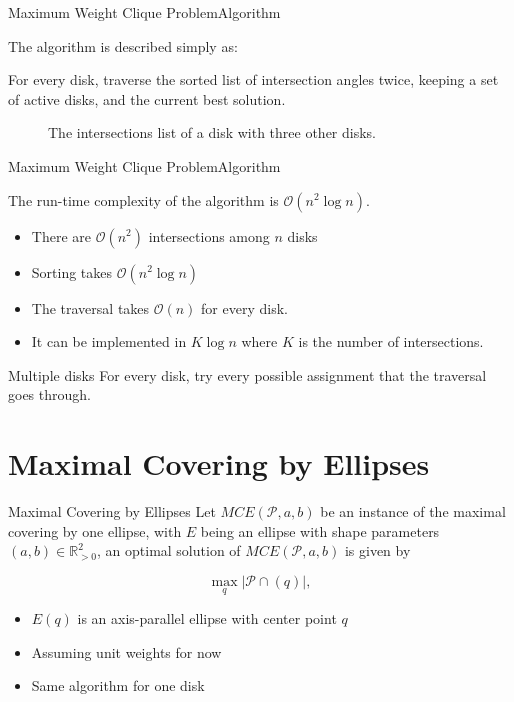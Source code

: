 \documentclass{beamer}
\newcommand{\R}{\mathbb{R}}
\newcommand{\Pp}{\mathscr{P}}
\newcommand{\bigO}{\mathscr{O}}
\begin{document}
\begin{frame}{Maximum Weight Clique Problem}{Algorithm}
	
	The algorithm is described simply as:
	
	For every disk, traverse the sorted list of intersection angles twice, keeping a set of active disks, and the current best solution.
	
\begin{figure}[H]
	\centering
	
	\caption{The intersections list of a disk with three other disks.}
	
	\label{fig:array_disks}
\end{figure}
\end{frame}


\begin{frame}{Maximum Weight Clique Problem}{Algorithm}
	
	The run-time complexity of the algorithm is $\bigO(n^2\log{n})$.
	
	\begin{itemize}
		\item There are $\bigO(n^2)$ intersections among $n$ disks
		
		\item Sorting takes $\bigO(n^2\log{n})$
		
		\item The traversal takes $\bigO(n)$ for every disk.
		
		\item It can be implemented in $K\log{n}$ where $K$ is the number of intersections. 
	\end{itemize}

\begin{block}{Multiple disks}
	For every disk, try every possible assignment that the traversal goes through.
\end{block}
	

	
	
\end{frame}

\section{Maximal Covering by Ellipses}

\begin{frame}{Maximal Covering by Ellipses}
	Let $MCE(\Pp, a, b)$ be an instance of the maximal covering by one ellipse, with $E$ being an ellipse with shape parameters $(a,b) \in \R_{>0}^2$, an optimal solution of $MCE(\Pp, a, b)$ is given by
	
	\begin{equation*}
	\max_q |\Pp \cap (q)|,
	\end{equation*}

	\begin{itemize}
		\item $E(q)$ is an axis-parallel ellipse with center point $q$
		\item Assuming unit weights for now
		\item Same algorithm for one disk
	\end{itemize}

\end{frame}
\end{document}

